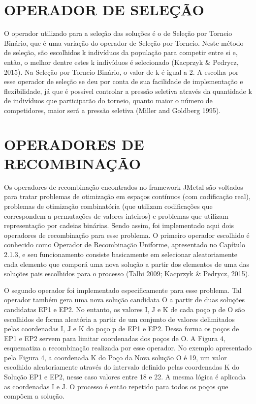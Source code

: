 \section{OPERADOR DE SELEÇÃO}

O operador utilizado para a seleção das soluções é o de Seleção por Torneio Binário, que é uma variação do operador de Seleção por Torneio. Neste método de seleção, são escolhidos k indivíduos da população para competir entre si e, então, o melhor dentre estes k indivíduos é selecionado (Kacprzyk \& Pedrycz, 2015). Na Seleção por Torneio Binário, o valor de k é igual a 2. A escolha por esse operador de seleção se deu por conta de sua facilidade de implementação e flexibilidade, já que é possível controlar a pressão seletiva através da quantidade k de indivíduos que participarão do torneio, quanto maior o número de competidores, maior será a pressão seletiva (Miller and Goldberg 1995).

\section{OPERADORES DE RECOMBINAÇÃO}

Os operadores de recombinação encontrados no framework JMetal são voltados para tratar problemas de otimização em espaços contínuos (com codificação real), problemas de otimização combinatória (que utilizam codificações que correspondem a permutações de valores inteiros) e problemas que utilizam representação por cadeias binárias. Sendo assim, foi implementado aqui dois operadores de recombinação para esse problema. O primeiro operador escolhido é conhecido como Operador de Recombinação Uniforme, apresentado no Capítulo 2.1.3, e seu funcionamento consiste basicamente em selecionar aleatoriamente cada elemento que comporá uma nova solução a partir dos elementos de uma das soluções pais escolhidos para o processo (Talbi 2009; Kacprzyk \& Pedrycz, 2015).

O segundo operador foi implementado especificamente para esse problema.  Tal operador também gera uma nova solução candidata O a partir de duas soluções candidatas EP1 e EP2. No entanto, os valores I, J e K de cada poço p de O são escolhidos de forma aleatória a partir de um conjunto de valores delimitados pelas coordenadas I, J e K do poço p de EP1 e EP2. Dessa forma os poços de EP1 e EP2 servem para limitar coordenadas dos poços de O. A Figura 4, esquematiza a recombinação realizada por esse operador. No exemplo apresentado pela Figura 4, a coordenada K do Poço da Nova solução O é 19, um valor escolhido aleatoriamente através do intervalo definido pelas coordenadas K do Solução EP1 e EP2, nesse caso valores entre 18 e 22. A mesma lógica é aplicada as coordenadas I e J. O processo é então repetido para todos os poços que compõem a solução.

